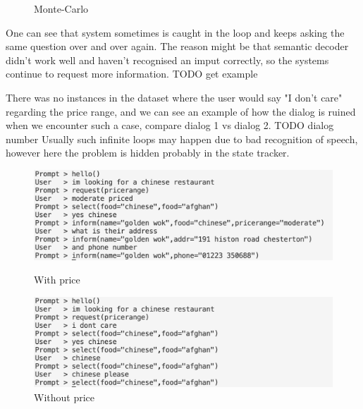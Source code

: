 \documentclass[12pt,titlepage,a4paper]{article}
\begin{document}
\begin{figure}[!htb]
      \caption{Monte-Carlo}
    \endminipage
\end{figure}

One can see that system sometimes is caught in the loop and keeps asking the same question over and over again. The reason might be that semantic decoder didn't work well and haven't recognised an imput correctly, so the systems continue to request more information. TODO get example

There was no instances in the dataset where the user would say "I don't care" regarding the price range, and we can see an example of how the dialog is ruined when we encounter such a case, compare dialog 1 vs dialog 2. TODO dialog number Usually such infinite loops may happen due to bad recognition of speech, however here the problem is hidden probably in the state tracker. 


\begin{figure}[!htb]
      \includegraphics[width=\linewidth]{with_price.png}
      \caption{With price}
    \endminipage\hfill
      \includegraphics[width=\linewidth]{without_price.png}
      \caption{Without price}
    \endminipage
\end{figure}
\end{document}
